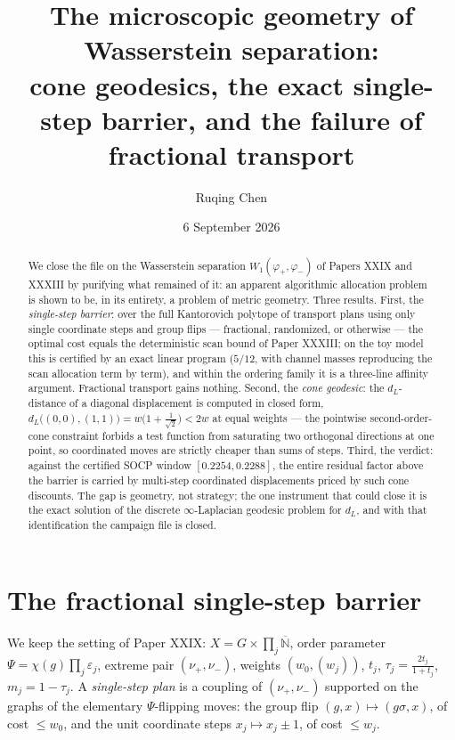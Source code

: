 \documentclass[11pt]{amsart}
\title[The microscopic geometry of Wasserstein separation]{The microscopic geometry of Wasserstein separation:\\ cone geodesics, the exact single-step barrier, and the failure of fractional transport}
\author{Ruqing Chen}
\date{6 September 2026}
\theoremstyle{remark}
\begin{document}
\begin{abstract}
We close the file on the Wasserstein separation $W_1(\varphi_+,\varphi_-)$ of Papers XXIX
and XXXIII by purifying what remained of it: an apparent algorithmic allocation problem
is shown to be, in its entirety, a problem of metric geometry. Three results. First, the
\emph{single-step barrier}: over the full Kantorovich polytope of transport plans using
only single coordinate steps and group flips --- fractional, randomized, or otherwise ---
the optimal cost equals the deterministic scan bound of Paper XXXIII; on the toy model
this is certified by an exact linear program ($5/12$, with channel masses reproducing the
scan allocation term by term), and within the ordering family it is a three-line affinity
argument. Fractional transport gains nothing. Second, the \emph{cone geodesic}: the
$d_L$-distance of a diagonal displacement is computed in closed form,
$d_L\bigl((0,0),(1,1)\bigr)=w\bigl(1+\tfrac1{\sqrt2}\bigr)<2w$ at equal weights --- the
pointwise second-order-cone constraint forbids a test function from saturating two
orthogonal directions at one point, so coordinated moves are strictly cheaper than sums
of steps. Third, the verdict: against the certified SOCP window $[0.2254,0.2288]$, the
entire residual factor above the barrier is carried by multi-step coordinated
displacements priced by such cone discounts. The gap is geometry, not strategy; the one
instrument that could close it is the exact solution of the discrete
$\infty$-Laplacian geodesic problem for $d_L$, and with that identification the campaign
file is closed.
\end{abstract}

\maketitle

\section{The fractional single-step barrier}\label{sec:barrier}

We keep the setting of Paper XXIX: $X=G\times\prod_j\overline{\mathbb N}$, order
parameter $\Psi=\chi(g)\prod_j\varepsilon_j$, extreme pair $(\nu_+,\nu_-)$, weights
$(w_0,(w_j))$, $t_j$, $\tau_j=\frac{2t_j}{1+t_j}$, $m_j=1-\tau_j$. A \emph{single-step
plan} is a coupling of $(\nu_+,\nu_-)$ supported on the graphs of the elementary
$\Psi$-flipping moves: the group flip $(g,x)\mapsto(g\sigma,x)$, of cost $\le w_0$, and
the unit coordinate steps $x_j\mapsto x_j\pm1$, of cost $\le w_j$.
\end{document}
